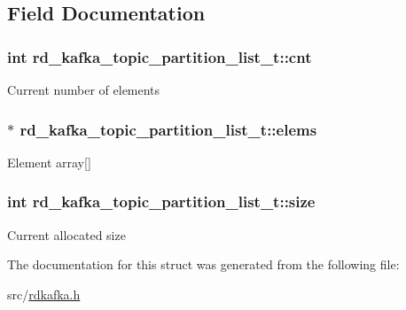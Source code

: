 \subsection{Field Documentation}
\hypertarget{structrd__kafka__topic__partition__list__t_a3b9ea691a2ecea3774a7e994c8c0c805}{
\subsubsection[{cnt}]{\setlength{\rightskip}{0pt plus 5cm}int rd\-\_\-kafka\-\_\-topic\-\_\-partition\-\_\-list\-\_\-t\-::cnt}}\label{structrd__kafka__topic__partition__list__t_a3b9ea691a2ecea3774a7e994c8c0c805}
Current number of elements \hypertarget{structrd__kafka__topic__partition__list__t_acf0fc06547578cd074423565440b58da}{
\subsubsection[{elems}]{$\ast$ rd\-\_\-kafka\-\_\-topic\-\_\-partition\-\_\-list\-\_\-t\-::elems}}\label{structrd__kafka__topic__partition__list__t_acf0fc06547578cd074423565440b58da}
Element array\mbox{[}\mbox{]} \hypertarget{structrd__kafka__topic__partition__list__t_a476e475526035de7b10cd79991771d57}{
\subsubsection[{size}]{\setlength{\rightskip}{0pt plus 5cm}int rd\-\_\-kafka\-\_\-topic\-\_\-partition\-\_\-list\-\_\-t\-::size}}\label{structrd__kafka__topic__partition__list__t_a476e475526035de7b10cd79991771d57}
Current allocated size 

The documentation for this struct was generated from the following file\-:\begin{DoxyCompactItemize}
\item 
src/\hyperlink{rdkafka_8h}{rdkafka.\-h}\end{DoxyCompactItemize}
